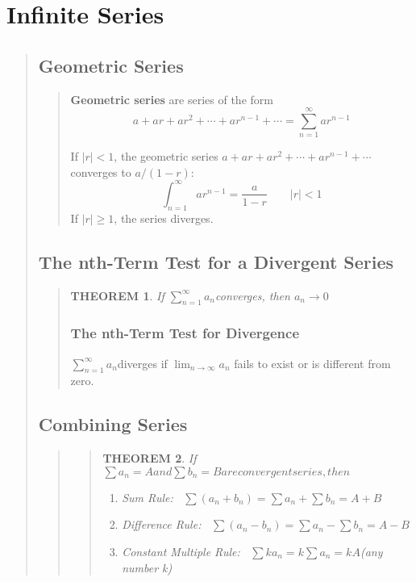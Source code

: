 \documentclass{report}
\newtheorem{theorem}{THEOREM}
\begin{document}
\section{Infinite Series }
\begin{quote}

	\subsection{Geometric Series}
	\begin{quote}

		\textbf{Geometric series} are series of the form 
		$$a + ar + ar^2 +\cdots + ar^{n - 1} + \cdots = \sum_{n = 1}^{\infty} a r^{n-1}$$

		If $| r | < 1$, the geometric series $a + ar + ar^2 + \cdots + ar^{n-1} + \cdots$ converges to $a/(1-r)$:
		$$\int_{n = 1}^{\infty} ar^{n-1} = \frac{a}{1-r}\qquad |r|<1$$
		If $|r| \geq 1$, the series diverges.

	\end{quote}

	\subsection{The nth-Term Test for a Divergent Series}
	\begin{quote}

		\begin{theorem}
			If $\sum_{n=1}^{\infty}a_n$converges, then $a_n\to 0$
		\end{theorem}

		\subsubsection{The nth-Term Test for Divergence}
		$\sum_{n=1}^{\infty}a_n$diverges if $\lim_{n\to\infty}a_n$ fails to exist or is different from zero.

	\end{quote}

	\subsection{Combining Series}
	\begin{quote}

		\begin{quote}
		\begin{theorem}
			If $\sum a_n = A and \sum b_n = B are convergent series, then$
			\begin{enumerate}
				\item {\textit{Sum Rule:}}  \qquad \qquad \qquad \qquad \, $\sum(a_n + b_n) = \sum a_n + \sum b_n = A + B$
				\item {\textit{Difference Rule:}} \qquad \qquad \; \; \; \, $\sum(a_n - b_n) = \sum a_n - \sum b_n = A - B$
				\item {\textit{Constant Multiple Rule:}} \, \qquad   $\sum ka_n = k\sum a_n = kA$\qquad(any number k)
			\end{enumerate}
		\end{theorem}
		\end{quote}


\end{quote}
\end{quote}
\end{document}
